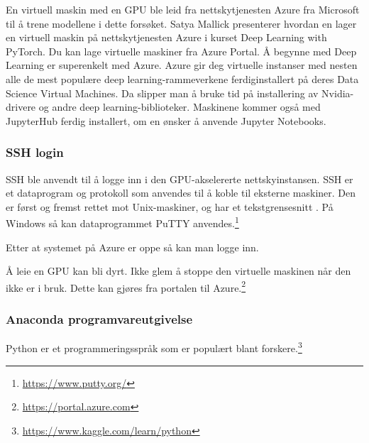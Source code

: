 En virtuell maskin med en GPU ble leid fra nettskytjenesten Azure fra Microsoft til å trene modellene i dette forsøket. Satya Mallick presenterer hvordan en lager en virtuell maskin på nettskytjenesten Azure i kurset Deep Learning with PyTorch. Du kan lage virtuelle maskiner fra Azure Portal. Å begynne med Deep Learning er superenkelt med Azure. Azure gir deg virtuelle instanser med nesten alle de mest populære deep learning-rammeverkene ferdiginstallert på deres Data Science Virtual Machines. Da slipper man å bruke tid på installering av Nvidia-drivere og andre deep learning-biblioteker. Maskinene kommer også med JupyterHub ferdig installert, om en ønsker å anvende Jupyter Notebooks. \cite{Mallick m.fl. 2020}


\subsubsection{SSH login}

SSH ble anvendt til å logge inn i den GPU-akselererte nettskyinstansen. SSH er et dataprogram og protokoll som anvendes til å koble til eksterne maskiner. Den er først og fremst rettet mot Unix-maskiner, og har et tekstgrensesnitt \cite{Mallick m.fl. 2020}. På Windows så kan dataprogrammet PuTTY anvendes.\footnote{\url{https://www.putty.org/}}

Etter at systemet på Azure er oppe så kan man logge inn.%

Å leie en GPU kan bli dyrt. Ikke glem å stoppe den virtuelle maskinen når den ikke er i bruk. Dette kan gjøres fra portalen til Azure.\footnote{\url{https://portal.azure.com}}


\subsubsection{Anaconda programvareutgivelse}

Python er et programmeringsspråk som er populært blant forskere.\footnote{\url{https://www.kaggle.com/learn/python}} \cite{Morris 2020}

